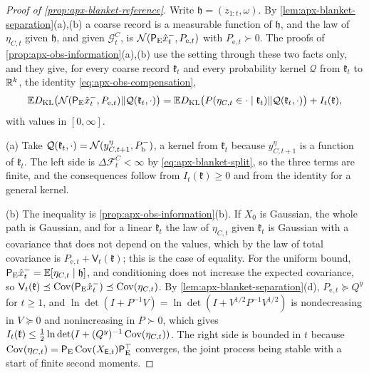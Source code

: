 \begin{proof}[Proof of \cref{prop:apx-blanket-reference}]
Write $\mathfrak h=(z_{1:t},\omega)$. By \cref{lem:apx-blanket-separation}(a),(b) a coarse record is a measurable function of $\mathfrak h$, and the law of $\eta_{C,t}$ given $\mathfrak h$, and given $\mathcal G^C_t$, is $\mathcal{N}(\mathsf P_{\mathrm E}\hat x^-_t,P_{\mathrm e,t})$ with $P_{\mathrm e,t}\succ0$. The proofs of \cref{prop:apx-obs-information}(a),(b) use the setting through these two facts only, and they give, for every coarse record $\mathfrak k_t$ and every probability kernel $\mathcal Q$ from $\mathfrak k_t$ to $\mathbb{R}^k$, the identity \eqref{eq:apx-obs-compensation},
\begin{equation*}
\mathbb{E}D_{\mathrm{KL}}\bigl(\mathcal{N}(\mathsf P_{\mathrm E}\hat x^-_t,P_{\mathrm e,t})\Vert\mathcal Q(\mathfrak k_t,\cdot)\bigr)=\mathbb{E}D_{\mathrm{KL}}\bigl(P(\eta_{C,t}\in\cdot\mid\mathfrak k_t)\Vert\mathcal Q(\mathfrak k_t,\cdot)\bigr)+I_t(\mathfrak k),
\end{equation*}
with values in $[0,\infty]$.

(a) Take $\mathcal Q(\mathfrak k_t,\cdot)=\mathcal{N}(y^\eta_{C,t+1},P^-_{\mathrm b})$, a kernel from $\mathfrak k_t$ because $y^\eta_{C,t+1}$ is a function of $\mathfrak k_t$. The left side is $\Delta\mathcal F^C_t<\infty$ by \eqref{eq:apx-blanket-split}, so the three terms are finite, and the consequences follow from $I_t(\mathfrak k)\ge0$ and from the identity for a general kernel.

(b) The inequality is \cref{prop:apx-obs-information}(b). If $X_0$ is Gaussian, the whole path is Gaussian, and for a linear $\mathfrak k_t$ the law of $\eta_{C,t}$ given $\mathfrak k_t$ is Gaussian with a covariance that does not depend on the values, which by the law of total covariance is $P_{\mathrm e,t}+\mathsf V_t(\mathfrak k)$; this is the case of equality. For the uniform bound, $\mathsf P_{\mathrm E}\hat x^-_t=\mathbb{E}[\eta_{C,t}\mid\mathfrak h]$, and conditioning does not increase the expected covariance, so $\mathsf V_t(\mathfrak k)\preceq\operatorname{Cov}(\mathsf P_{\mathrm E}\hat x^-_t)\preceq\operatorname{Cov}(\eta_{C,t})$. By \cref{lem:apx-blanket-separation}(d), $P_{\mathrm e,t}\succeq Q^y$ for $t\ge1$, and $\ln\det(I+P^{-1}V)=\ln\det(I+V^{1/2}P^{-1}V^{1/2})$ is nondecreasing in $V\succeq0$ and nonincreasing in $P\succ0$, which gives $I_t(\mathfrak k)\le\frac12\ln\det(I+(Q^y)^{-1}\operatorname{Cov}(\eta_{C,t}))$. The right side is bounded in $t$ because $\operatorname{Cov}(\eta_{C,t})=\mathsf P_{\mathrm E}\operatorname{Cov}(X_{\mathsf{E},t})\mathsf P_{\mathrm E}^\top$ converges, the joint process being stable with a start of finite second moments.


\end{proof}
